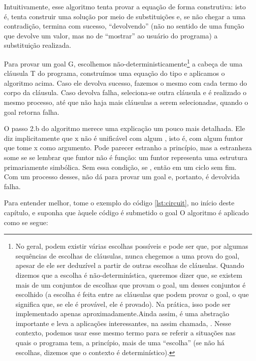 \documentclass{article}
\begin{document}
Intuitivamente, esse algoritmo tenta provar a equação de forma construtiva: isto é, tenta construir uma solução por meio de substituições e, se não chegar a uma contradição, termina com sucesso, ``devolvendo'' (não no sentido de uma função que devolve um valor, mas no de ``mostrar'' ao usuário do programa) a substituição realizada.

Para provar um goal G, escolhemos não-deterministicamente\footnote{No geral, podem existir várias escolhas possíveis e pode ser que, por algumas sequências de escolhas de cláusulas, nunca chegemos a uma prova do goal, apesar de ele ser deduzível a partir de outras escolhas de cláusulas. Quando dizemos que a escolha é não-determinística, queremos dizer que, se existem mais de um conjuntos de escolhas que provam o goal, um desses conjuntos é escolhido (a escolha é feita entre as cláusulas que podem provar o
  goal, o que significa que, se ele é provável, ele é provado). Na prática, isso pode ser implementado apenas aproximadamente.Ainda assim, é uma abstração importante e leva a aplicações interessantes, na assim chamada, . Nesse contexto, podemos usar esse mesmo termo para se referir a situações nas quais o programa tem, a princípio, mais de uma ``escolha'' (se não há escolhas, dizemos que o contexto é determinístico).} a cabeça de uma cláusula T do
programa, construímos uma equação do tipo  e aplicamos o algoritmo acima. Caso ele devolva sucesso, fazemos o mesmo com cada termo do corpo da cláusula. Caso devolva falha, seleciona-se outra cláusula e é realizado o mesmo processo, até que não haja mais cláusulas a serem selecionadas, quando o goal retorna falha.

O passo 2.b do algoritmo merece uma explicação um pouco mais detalhada. Ele diz implicitamente que x não é unificável com algum , isto é, com algum funtor que tome x como argumento. Pode parecer estranho a princípio, mas a estranheza some se se lembrar que funtor não é função: um funtor representa uma estrutura primariamente simbólica. Sem essa condição, se , então  em um ciclo sem fim. Com um processo desses, não dá para provar um goal e, portanto, é devolvida falha.

Para entender melhor, tome o exemplo do código \ref{lst:circuit}, no início deste capítulo, e suponha que àquele código é submetido o goal  O algoritmo é aplicado como se segue:
\end{document}
